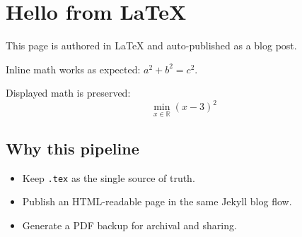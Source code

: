 \documentclass{article}
\begin{document}
\section{Hello from LaTeX}

This page is authored in \LaTeX{} and auto-published as a blog post.

Inline math works as expected: $a^2 + b^2 = c^2$.

Displayed math is preserved:
\[
\min_{x \in \mathbb{R}} \left(x - 3\right)^2
\]

\subsection{Why this pipeline}

\begin{itemize}
  \item Keep \texttt{.tex} as the single source of truth.
  \item Publish an HTML-readable page in the same Jekyll blog flow.
  \item Generate a PDF backup for archival and sharing.
\end{itemize}
\end{document}
